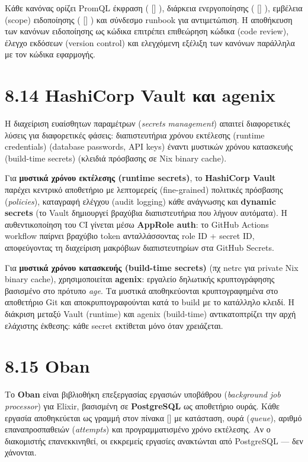\documentclass[11pt,a4paper,greek,twoside]{template-xe}
\let\origtexttt\texttt
\renewcommand{\texttt}[1]{%
  \begingroup
  \StrSubstitute{#1}{.}{.\allowbreak}[\tttmp]%
  \origtexttt{\tttmp}%
  \endgroup
}
\begin{document}
Κάθε κανόνας ορίζει PromQL έκφραση (\texttt{expr}), διάρκεια
ενεργοποίησης (\texttt{for}), εμβέλεια (scope) ειδοποίησης
(\texttt{hedwig\_scope}) και σύνδεσμο runbook για αντιμετώπιση. Η
αποθήκευση των κανόνων ειδοποίησης ως κώδικα επιτρέπει επιθεώρηση κώδικα
(code review), έλεγχο εκδόσεων (version control) και ελεγχόμενη εξέλιξη
των κανόνων παράλληλα με τον κώδικα εφαρμογής.

\section{8.14 HashiCorp Vault και
agenix}\label{hashicorp-vault-ux3baux3b1ux3b9-agenix}

Η διαχείριση ευαίσθητων παραμέτρων (\emph{secrets management}) απαιτεί
διαφορετικές λύσεις για διαφορετικές φάσεις: διαπιστευτήρια χρόνου
εκτέλεσης (runtime credentials) (database passwords, API keys) έναντι
μυστικών χρόνου κατασκευής (build-time secrets) (κλειδιά πρόσβασης σε
Nix binary cache).

Για \textbf{μυστικά χρόνου εκτέλεσης (runtime secrets)}, το
\textbf{HashiCorp Vault} παρέχει κεντρικό αποθετήριο με λεπτομερείς
(fine-grained) πολιτικές πρόσβασης (\emph{policies}), καταγραφή ελέγχου
(audit logging) κάθε ανάγνωσης και \textbf{dynamic secrets} (το Vault
δημιουργεί βραχύβια διαπιστευτήρια που λήγουν αυτόματα). Η
αυθεντικοποίηση του CI γίνεται μέσω \textbf{AppRole auth}: το GitHub
Actions workflow παίρνει βραχύβιο token ανταλλάσσοντας role ID + secret
ID, αποφεύγοντας τη διαχείριση μακρόβιων διαπιστευτηρίων στα GitHub
Secrets.

Για \textbf{μυστικά χρόνου κατασκευής (build-time secrets)} (πχ netrc
για private Nix binary cache), χρησιμοποιείται \textbf{agenix}: εργαλείο
δηλωτικής κρυπτογράφησης βασισμένο στο πρότυπο \emph{age}. Τα μυστικά
αποθηκεύονται κρυπτογραφημένα στο αποθετήριο Git και αποκρυπτογραφούνται
κατά το build με το κατάλληλο κλειδί. Η διάκριση μεταξύ Vault (runtime)
και agenix (build-time) αντικατοπτρίζει την αρχή ελάχιστης έκθεσης: κάθε
secret εκτίθεται μόνο όταν χρειάζεται.

\section{8.15 Oban}\label{oban}

Το \textbf{Oban} είναι βιβλιοθήκη επεξεργασίας εργασιών υποβάθρου
(\emph{background job processor}) για Elixir, βασισμένη σε
\textbf{PostgreSQL} ως αποθετήριο ουράς. Κάθε εργασία αποθηκεύεται ως
γραμμή στον πίνακα \texttt{oban\_jobs} με κατάσταση, ουρά
(\emph{queue}), αριθμό επαναπροσπαθειών (\emph{attempts}) και
προγραμματισμένο χρόνο εκτέλεσης. Αν ο διακομιστής επανεκκινηθεί, οι
εκκρεμείς εργασίες ανακτώνται από PostgreSQL --- δεν χάνονται.
\end{document}
